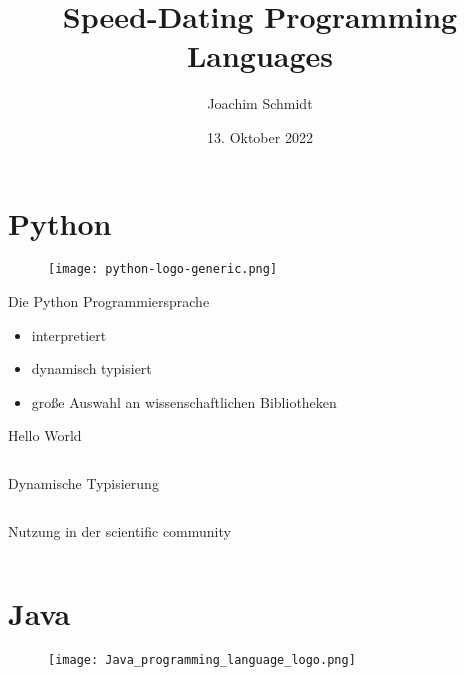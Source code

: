 \documentclass[aspectratio=169]{beamer}
\title{Speed-Dating Programming Languages}
\author{Joachim Schmidt}
\date{13. Oktober 2022}
\begin{document}

\begin{frame}{}
  \tableofcontents
\end{frame}

\section{Python}

\begin{frame}{}
  \begin{figure}
    \centering
    \texttt{[image: python-logo-generic.png]}
    \caption{\cite{python_logo}}
    \label{fig:python_logo}
  \end{figure}
\end{frame}

\begin{frame}{Die Python Programmiersprache}
  \begin{itemize}
  \item interpretiert
  \item dynamisch typisiert
  \item große Auswahl an wissenschaftlichen Bibliotheken
  \end{itemize}
\end{frame}

\begin{frame}{Hello World}
  \inputminted[linenos]{python}{examples/hello.py}
\end{frame}

\begin{frame}{Dynamische Typisierung}
  \inputminted[linenos,fontsize=\scriptsize]{python}{examples/dynamic_typing.py}
\end{frame}

\begin{frame}{Nutzung in der scientific community}
  \inputminted[linenos]{python}{examples/dynamic_typing.py}
\end{frame}

\section{Java}

\begin{frame}{}
  \begin{figure}
    \centering
    \texttt{[image: Java\_programming\_language\_logo.png]}
    \caption{\cite{java_logo}}
    \label{fig:java_logo}
  \end{figure}
\end{frame}
\end{document}
